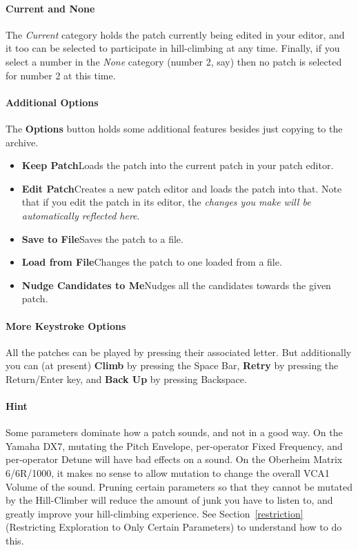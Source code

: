 \documentclass{article}
\begin{document}
\paragraph{Current and None} The {\it Current} category holds the patch currently being edited in your editor, and it too can be selected to participate in hill-climbing at any time.  Finally, if you select a number in the {\it None} category (number 2, say) then no patch is selected for number 2 at this time.

\paragraph{Additional Options} The {\bf Options} button holds some additional features besides just copying to the archive.  

\enlargethispage{0.5em}

\begin{itemize}
\item {\bf Keep Patch}\quad Loads the patch into the current patch in your patch editor.
\item {\bf Edit Patch}\quad Creates a new patch editor and loads the patch into that.  Note that if you edit the patch in its editor, the {\it changes you make will be automatically reflected here}.
\item {\bf Save to File}\quad Saves the patch to a file.
\item {\bf Load from File}\quad Changes the patch to one loaded from a file. 
\item {\bf Nudge Candidates to Me}\quad Nudges all the candidates towards the given patch. 
\end{itemize}

\paragraph{More Keystroke Options}

All the patches can be played by pressing their associated letter.  But additionally you can (at present) {\bf Climb} by pressing the Space Bar, {\bf Retry} by pressing the Return/Enter key, and {\bf Back Up} by pressing Backspace.

\paragraph{\color{red}Hint} Some parameters dominate how a patch sounds, and not in a good way.  On the Yamaha DX7, mutating the Pitch Envelope, per-operator Fixed Frequency, and per-operator Detune will have bad effects on a sound.  On the Oberheim Matrix 6/6R/1000, it makes no sense to allow mutation to change the overall VCA1 Volume of the sound.   Pruning certain parameters so that they cannot be mutated by the Hill-Climber will reduce the amount of junk you have to listen to, and greatly improve your hill-climbing experience. See Section~\ref{restriction} (Restricting Exploration to Only Certain Parameters) to understand how to do this.
\end{document}
